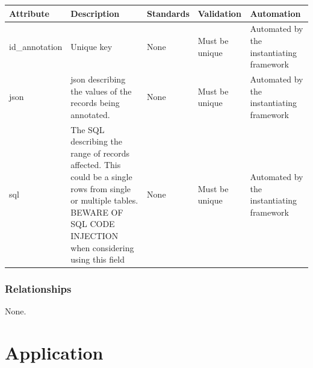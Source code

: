 \documentclass[
]{article}
\newcounter{none}
\begin{document}
{\def\LTcaptype{none} 
\begin{longtable}[]{@{}
  >{\raggedright\arraybackslash}p{}
  >{\raggedright\arraybackslash}p{}
  >{\raggedright\arraybackslash}p{}
  >{\raggedright\arraybackslash}p{}
  >{\raggedright\arraybackslash}p{}@{}}
\toprule\noalign{}
\begin{minipage}[b]{\linewidth}\raggedright
Attribute
\end{minipage} & \begin{minipage}[b]{\linewidth}\raggedright
Description
\end{minipage} & \begin{minipage}[b]{\linewidth}\raggedright
Standards
\end{minipage} & \begin{minipage}[b]{\linewidth}\raggedright
Validation
\end{minipage} & \begin{minipage}[b]{\linewidth}\raggedright
Automation
\end{minipage} \\
\midrule\noalign{}
\endhead
\bottomrule\noalign{}
\endlastfoot
id\_annotation & Unique key & None & Must be unique & Automated by the
instantiating framework \\
json & json describing the values of the records being annotated. & None
& Must be unique & Automated by the instantiating framework \\
sql & The SQL describing the range of records affected. This could be a
single rows from single or multiple tables. BEWARE OF SQL CODE INJECTION
when considering using this field & None & Must be unique & Automated by
the instantiating framework \\
\end{longtable}
}

\subsubsection{Relationships}\label{relationships}

None.

\section{Application}\label{application}
\end{document}
